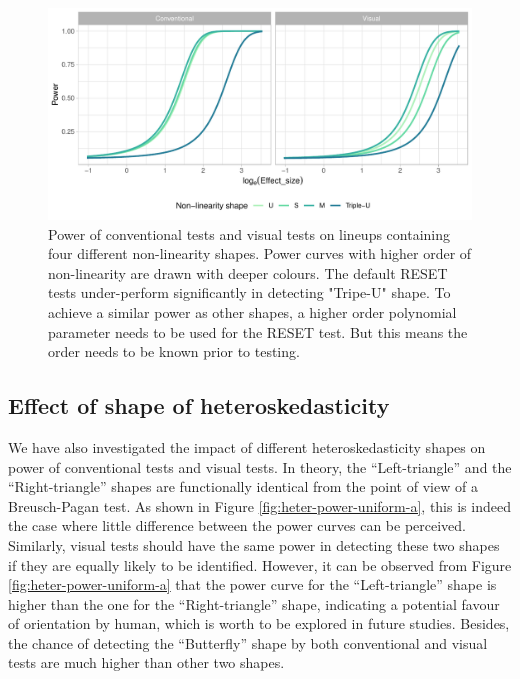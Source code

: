 \documentclass[]{interact}
\theoremstyle{plain}%
\theoremstyle{definition}
\theoremstyle{remark}
\begin{document}
\begin{figure}

{\centering \includegraphics[width=1\linewidth]{paper_comparison_files/figure-latex/poly-power-uniform-j-1} 

}

\caption{Power of conventional tests and visual tests on lineups containing four different non-linearity shapes. Power curves with higher order of non-linearity are drawn with deeper colours. The default RESET tests under-perform significantly in detecting "Tripe-U" shape. To achieve a similar power as other shapes, a higher order polynomial parameter needs to be used for the RESET test. But this means the order needs to be known prior to testing.}\label{fig:poly-power-uniform-j}
\end{figure}

\hypertarget{effect-of-shape-of-heteroskedasticity}{%
\subsection{Effect of shape of
heteroskedasticity}\label{effect-of-shape-of-heteroskedasticity}}

We have also investigated the impact of different heteroskedasticity
shapes on power of conventional tests and visual tests. In theory, the
``Left-triangle'' and the ``Right-triangle'' shapes are functionally
identical from the point of view of a Breusch-Pagan test. As shown in
Figure \ref{fig:heter-power-uniform-a}, this is indeed the case where
little difference between the power curves can be perceived. Similarly,
visual tests should have the same power in detecting these two shapes if
they are equally likely to be identified. However, it can be observed
from Figure \ref{fig:heter-power-uniform-a} that the power curve for the
``Left-triangle'' shape is higher than the one for the
``Right-triangle'' shape, indicating a potential favour of orientation
by human, which is worth to be explored in future studies. Besides, the
chance of detecting the ``Butterfly'' shape by both conventional and
visual tests are much higher than other two shapes.
\end{document}
